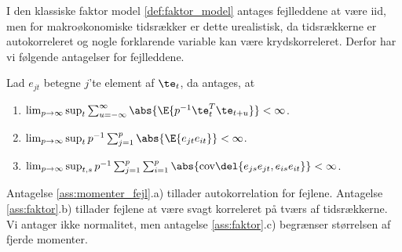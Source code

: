 I den klassiske faktor model \ref{def:faktor_model} antages fejlleddene at være iid, men for makroøkonomiske tidsrækker er dette urealistisk, da tidsrækkerne er autokorreleret og nogle forklarende variable kan være krydskorreleret. 
Derfor har vi følgende antagelser for fejlleddene.
%
\begin{ass} \label{ass:momenter_fejl}
Lad \(e_{jt}\) betegne \(j\)'te element af \(\te_t\), da antages, at
\begin{enumerate}[label=\alph*)]
\item \(\lim_{p \rightarrow \infty} \sup_t \sum_{u = - \infty}^\infty \abs{\E{p^{-1} \te_t^T \te_{t+u}}} < \infty\).
\item \(\lim_{p \rightarrow \infty} \sup_t p^{-1} \sum_{j = 1}^p \abs{\E{e_{jt} e_{it}}} < \infty\).
\item \(\lim_{p \rightarrow \infty} \sup_{t,s} p^{-1} \sum_{j=1}^p \sum_{i=1}^p \abs{\text{cov}\del{e_{js} e_{jt}, e_{is} e_{it}}} < \infty\).
\end{enumerate}
\end{ass}
%
Antagelse \ref{ass:momenter_fejl}.a) tillader autokorrelation for fejlene.
Antagelse \ref{ass:faktor}.b) tillader fejlene at være svagt korreleret på tværs af tidsrækkerne.
Vi antager ikke normalitet, men antagelse \ref{ass:faktor}.c) begrænser størrelsen af fjerde momenter.

